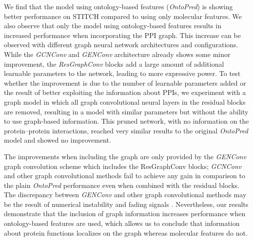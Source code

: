 \documentclass{bioinfo}
\renewcommand{\cite}{\citep}
\begin{document}
We find that the model using ontology-based features
(\textit{OntoPred}) is showing better performance on STITCH compared
to using only molecular features. We also observe that only the model
using ontology-based features results in increased performance when
incorporating the PPI graph. This increase can be observed with
different graph neural network architectures and configurations. While
the {\em GCNConv} and {\em GENConv} architecture already shows some
minor improvement, the \textit{ResGraphConv} blocks add a large amount
of additional learnable parameters to the network, leading to more
expressive power. To test whether the improvement is due to the number
of learnable parameters added or the result of better exploiting the
information about PPIs, we experiment with a graph model in which all
graph convolutional neural layers in the residual blocks are removed,
resulting in a model with similar parameters but without the ability
to use graph-based information. This pruned network, with no
information on the protein--protein interactions, reached very similar
results to the original \textit{OntoPred} model and showed no
improvement.

The improvements when including the graph are only provided by the
\textit{GENConv} graph convolution scheme which includes the
ResGraphConv blocks; \textit{GCNConv} and other graph
convolutional methods fail to achieve any gain in comparison to the
plain \textit{OntoPred} performance even when combined with the
residual blocks. The discrepancy between {\em GENConv} and other graph
convolutional methods may be the result of numerical instability and
fading signals \cite{}.
Nevertheless, our results demonstrate that the inclusion of graph
information increases performance when ontology-based features are
used, which allows us to conclude that information about protein
functions localizes on the graph whereas molecular features do not.






\end{document}

